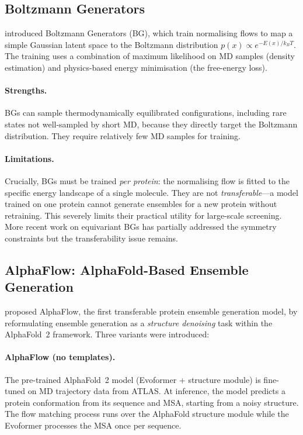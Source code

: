 \documentclass[12pt,a4paper]{article}
\begin{document}
\subsection{Boltzmann Generators}
\label{sec:boltzmann_gen}

\citet{noe2019} introduced Boltzmann Generators (BG), which train normalising flows to map
a simple Gaussian latent space to the Boltzmann distribution $p(x) \propto e^{-E(x)/k_BT}$.
The training uses a combination of maximum likelihood on MD samples (density estimation)
and physics-based energy minimisation (the free-energy loss).

\paragraph{Strengths.}
BGs can sample thermodynamically equilibrated configurations, including rare states not
well-sampled by short MD, because they directly target the Boltzmann distribution.  They
require relatively few MD samples for training.

\paragraph{Limitations.}
Crucially, BGs must be trained \emph{per protein}: the normalising flow is fitted to the
specific energy landscape of a single molecule.  They are not \emph{transferable}---a model
trained on one protein cannot generate ensembles for a new protein without retraining.  This
severely limits their practical utility for large-scale screening.  More recent work on
equivariant BGs \citep{klein2023} has partially addressed the symmetry constraints but the
transferability issue remains.

\subsection{AlphaFlow: AlphaFold-Based Ensemble Generation}
\label{sec:alphaflow}

\citet{jing2024alphaflow} proposed AlphaFlow, the first transferable protein ensemble generation
model, by reformulating ensemble generation as a \emph{structure denoising} task within the
AlphaFold~2 framework.  Three variants were introduced:

\paragraph{AlphaFlow (no templates).}
The pre-trained AlphaFold~2 model (Evoformer + structure module) is fine-tuned on MD trajectory
data from ATLAS.  At inference, the model predicts a protein conformation from its sequence and
MSA, starting from a noisy structure.  The flow matching process runs over the AlphaFold structure
module while the Evoformer processes the MSA once per sequence.
\end{document}
